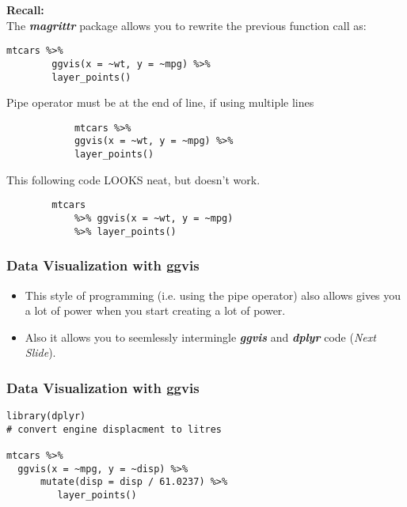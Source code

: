 \documentclass[MASTER.tex]{subfiles}
\begin{document}
 
\begin{frame}[fragile]
\Large
\textbf{Recall:}\\
The \textbf{\textit{magrittr}} package allows you to rewrite the previous function call as:
\begin{framed}
\begin{verbatim}
mtcars %>%
        ggvis(x = ~wt, y = ~mpg) %>%
        layer_points()
\end{verbatim}
\end{framed}
\end{frame}
\begin{frame}[fragile]
	\large
Pipe operator must be at the end of line, if using multiple lines
		\begin{framed}
			\begin{verbatim}
			mtcars %>%
			ggvis(x = ~wt, y = ~mpg) %>%
			layer_points()
			\end{verbatim}
		\end{framed}
This following code LOOKS neat, but doesn't work. 
		\begin{framed}
		\begin{verbatim}
		mtcars 
		    %>% ggvis(x = ~wt, y = ~mpg) 
		    %>% layer_points()
		\end{verbatim}
	\end{framed}
\end{frame}
\begin{frame}
\frametitle{Data Visualization with ggvis}
\Large
\vspace{-1.8cm}
\begin{itemize}
\item This style of programming (i.e. using the pipe operator) also allows gives you a lot of power when you start creating a lot of power.
\item Also it allows you to seemlessly intermingle \textbf{\textit{ggvis}} and \textbf{\textit{dplyr}} code (\textit{Next Slide}).

\end{itemize}


\end{frame}
\begin{frame}[fragile]
	\frametitle{Data Visualization with ggvis}
\Large	
\begin{framed}
\begin{verbatim}
library(dplyr)
# convert engine displacment to litres

mtcars %>%
  ggvis(x = ~mpg, y = ~disp) %>%
      mutate(disp = disp / 61.0237) %>% 
         layer_points()
\end{verbatim}
\end{framed}
\end{frame}
\end{document}
